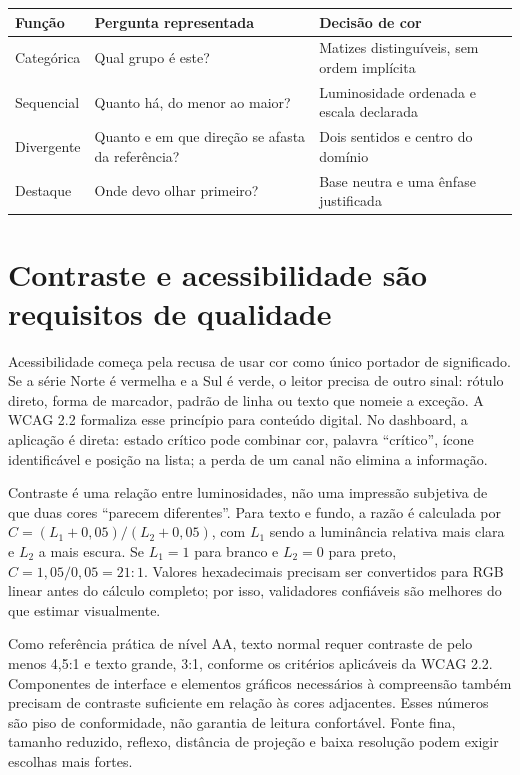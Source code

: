 \begin{center}
\begin{tabularx}{\textwidth}{p{2.7cm}Y Y}
\toprule
Função & Pergunta representada & Decisão de cor \\
\midrule
Categórica & Qual grupo é este? & Matizes distinguíveis, sem ordem implícita \\
Sequencial & Quanto há, do menor ao maior? & Luminosidade ordenada e escala declarada \\
Divergente & Quanto e em que direção se afasta da referência? & Dois sentidos e centro do domínio \\
Destaque & Onde devo olhar primeiro? & Base neutra e uma ênfase justificada \\
\bottomrule
\end{tabularx}
\end{center}

\section{Contraste e acessibilidade são requisitos de qualidade}

Acessibilidade começa pela recusa de usar cor como único portador de significado. Se a série Norte é vermelha e a Sul é verde, o leitor precisa de outro sinal: rótulo direto, forma de marcador, padrão de linha ou texto que nomeie a exceção. A WCAG 2.2 formaliza esse princípio para conteúdo digital. No dashboard, a aplicação é direta: estado crítico pode combinar cor, palavra ``crítico'', ícone identificável e posição na lista; a perda de um canal não elimina a informação.

Contraste é uma relação entre luminosidades, não uma impressão subjetiva de que duas cores ``parecem diferentes''. Para texto e fundo, a razão é calculada por $C=(L_1+0{,}05)/(L_2+0{,}05)$, com $L_1$ sendo a luminância relativa mais clara e $L_2$ a mais escura. Se $L_1=1$ para branco e $L_2=0$ para preto, $C=1{,}05/0{,}05=21:1$. Valores hexadecimais precisam ser convertidos para RGB linear antes do cálculo completo; por isso, validadores confiáveis são melhores do que estimar visualmente.

Como referência prática de nível AA, texto normal requer contraste de pelo menos 4,5:1 e texto grande, 3:1, conforme os critérios aplicáveis da WCAG 2.2. Componentes de interface e elementos gráficos necessários à compreensão também precisam de contraste suficiente em relação às cores adjacentes. Esses números são piso de conformidade, não garantia de leitura confortável. Fonte fina, tamanho reduzido, reflexo, distância de projeção e baixa resolução podem exigir escolhas mais fortes.

